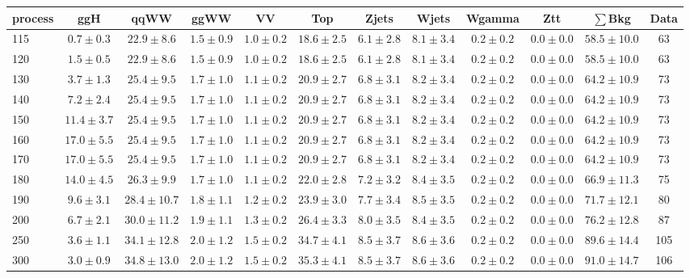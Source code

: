 \begin{table}
{\tiny
 \begin{center}
 \begin{tabular}{l c c c c c c c c c c c }
 \hline
 process & ggH & qqWW & ggWW & VV & Top & Zjets & Wjets & Wgamma & Ztt & $\sum$Bkg & Data \\
 \hline
115 & $0.7\pm0.3$ & $22.9\pm8.6$ & $1.5\pm0.9$ & $1.0\pm0.2$ & $18.6\pm2.5$ & $6.1\pm2.8$ & $8.1\pm3.4$ & $0.2\pm0.2$ & $0.0\pm0.0$ & $58.5\pm10.0$ & 63 \\
120 & $1.5\pm0.5$ & $22.9\pm8.6$ & $1.5\pm0.9$ & $1.0\pm0.2$ & $18.6\pm2.5$ & $6.1\pm2.8$ & $8.1\pm3.4$ & $0.2\pm0.2$ & $0.0\pm0.0$ & $58.5\pm10.0$ & 63 \\
130 & $3.7\pm1.3$ & $25.4\pm9.5$ & $1.7\pm1.0$ & $1.1\pm0.2$ & $20.9\pm2.7$ & $6.8\pm3.1$ & $8.2\pm3.4$ & $0.2\pm0.2$ & $0.0\pm0.0$ & $64.2\pm10.9$ & 73 \\
140 & $7.2\pm2.4$ & $25.4\pm9.5$ & $1.7\pm1.0$ & $1.1\pm0.2$ & $20.9\pm2.7$ & $6.8\pm3.1$ & $8.2\pm3.4$ & $0.2\pm0.2$ & $0.0\pm0.0$ & $64.2\pm10.9$ & 73 \\
150 & $11.4\pm3.7$ & $25.4\pm9.5$ & $1.7\pm1.0$ & $1.1\pm0.2$ & $20.9\pm2.7$ & $6.8\pm3.1$ & $8.2\pm3.4$ & $0.2\pm0.2$ & $0.0\pm0.0$ & $64.2\pm10.9$ & 73 \\
160 & $17.0\pm5.5$ & $25.4\pm9.5$ & $1.7\pm1.0$ & $1.1\pm0.2$ & $20.9\pm2.7$ & $6.8\pm3.1$ & $8.2\pm3.4$ & $0.2\pm0.2$ & $0.0\pm0.0$ & $64.2\pm10.9$ & 73 \\
170 & $17.0\pm5.5$ & $25.4\pm9.5$ & $1.7\pm1.0$ & $1.1\pm0.2$ & $20.9\pm2.7$ & $6.8\pm3.1$ & $8.2\pm3.4$ & $0.2\pm0.2$ & $0.0\pm0.0$ & $64.2\pm10.9$ & 73 \\
180 & $14.0\pm4.5$ & $26.3\pm9.9$ & $1.7\pm1.0$ & $1.1\pm0.2$ & $22.0\pm2.8$ & $7.2\pm3.2$ & $8.4\pm3.5$ & $0.2\pm0.2$ & $0.0\pm0.0$ & $66.9\pm11.3$ & 75 \\
190 & $9.6\pm3.1$ & $28.4\pm10.7$ & $1.8\pm1.1$ & $1.2\pm0.2$ & $23.9\pm3.0$ & $7.7\pm3.4$ & $8.5\pm3.5$ & $0.2\pm0.2$ & $0.0\pm0.0$ & $71.7\pm12.1$ & 80 \\
200 & $6.7\pm2.1$ & $30.0\pm11.2$ & $1.9\pm1.1$ & $1.3\pm0.2$ & $26.4\pm3.3$ & $8.0\pm3.5$ & $8.4\pm3.5$ & $0.2\pm0.2$ & $0.0\pm0.0$ & $76.2\pm12.8$ & 87 \\
250 & $3.6\pm1.1$ & $34.1\pm12.8$ & $2.0\pm1.2$ & $1.5\pm0.2$ & $34.7\pm4.1$ & $8.5\pm3.7$ & $8.6\pm3.6$ & $0.2\pm0.2$ & $0.0\pm0.0$ & $89.6\pm14.4$ & 105 \\
300 & $3.0\pm0.9$ & $34.8\pm13.0$ & $2.0\pm1.2$ & $1.5\pm0.2$ & $35.3\pm4.1$ & $8.5\pm3.7$ & $8.6\pm3.6$ & $0.2\pm0.2$ & $0.0\pm0.0$ & $91.0\pm14.7$ & 106 \\

\end{tabular}
\end{center}}
\end{table}

